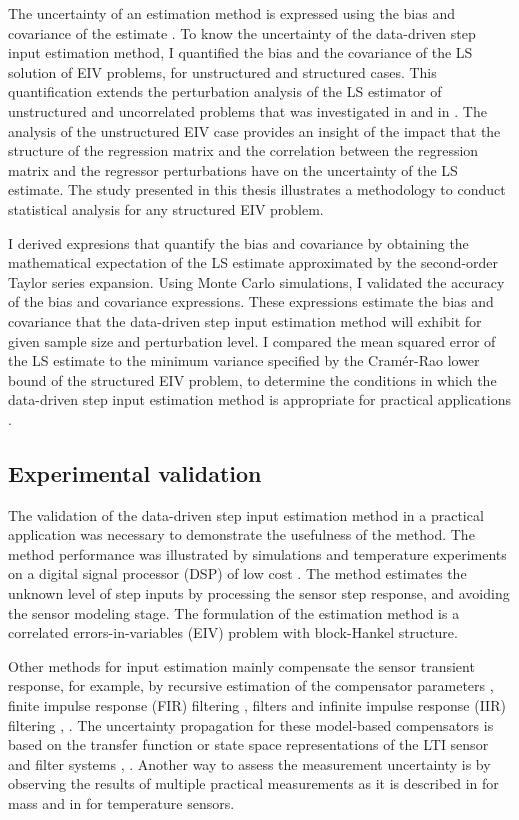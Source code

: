 The uncertainty of an estimation method is expressed using the bias and covariance of the estimate \citep{Pintelon12Book}.
To know the uncertainty of the data-driven step input estimation method, I quantified the bias and the covariance of the LS solution of EIV problems, for unstructured and structured cases. 
This quantification extends the perturbation analysis of the LS estimator of unstructured and uncorrelated problems that was investigated in \citep{Stewart90SPT} and in \citep{Vaccaro94}.
The analysis of the unstructured EIV case provides an insight of the impact that the structure of the regression matrix and the correlation between the regression matrix and the regressor perturbations have on the uncertainty of the LS estimate.
The study presented in this thesis illustrates a methodology to conduct statistical analysis for any structured EIV problem.

I derived expresions that quantify the bias and covariance by obtaining the mathematical expectation of the LS estimate approximated by the second-order Taylor series expansion.
Using Monte Carlo simulations, I validated the accuracy of the bias and covariance expressions.
These expressions estimate the bias and covariance that the data-driven step input estimation method will exhibit for given sample size and perturbation level.
I compared the mean squared error of the LS estimate to the minimum variance specified by the Cram\'er-Rao lower bound of the structured EIV problem, to determine the conditions in which the data-driven step input estimation method is appropriate for practical applications \citep{QuintanaCSDA}.


\subsection{Experimental validation}

The validation of the data-driven step input estimation method in a practical application was necessary to demonstrate the usefulness of the method.
The method performance was illustrated by simulations and temperature experiments on a digital signal processor (DSP) of low cost \citep{Markovsky15cep}.
The method estimates the unknown level of step inputs by processing the sensor step response, and 
avoiding the sensor modeling stage.
The formulation of the estimation method is a correlated errors-in-variables (EIV) problem with block-Hankel structure.

Other methods for input estimation mainly compensate the sensor transient response, for example, by 
recursive estimation of the compensator parameters \citep{Shu93}, 
finite impulse response (FIR) filtering \citep{Elster07}, \citep{Niedzwiecki16b} filters and 
infinite impulse response (IIR) filtering \citep{Pintelon90}, \citep{Elster08}.
The uncertainty propagation for these model-based compensators is based on the transfer function or state space representations of the LTI sensor and filter systems \citep{Link09}, \citep{Hale09}.
Another way to assess the measurement uncertainty is by observing the results of multiple practical measurements as it is described in \citep{Pietrzak14} for mass and in \citep{Ogorevc16} for temperature sensors.

